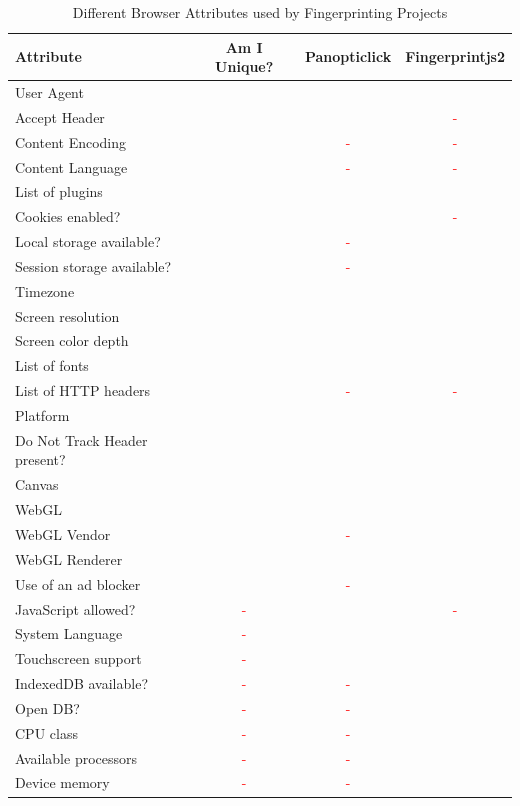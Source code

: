 \documentclass[
    fontsize=12pt,
    headings=small,
    parskip=half,
    bibliography=totoc,
    numbers=noenddot,
    open=any
    ]{scrreprt}
\newcommand{\cmark}{\textcolor{green}{\ding{51}}}
\newcommand{\xmark}{\textcolor{red}{-}}
\begin{document}
\renewcommand{\arraystretch}{1.2}
\begin{table}
\centering
\caption{Different Browser Attributes used by Fingerprinting Projects}
\begin{tabular}{ l c c c }
    \toprule
    Attribute & Am I Unique? & Panopticlick & Fingerprintjs2 \\
    \midrule
    User Agent & \cmark & \cmark & \cmark \\[3px]
    Accept Header & \cmark & \cmark & \xmark \\[3px]
    Content Encoding & \cmark & \xmark & \xmark \\[3px]
    Content Language & \cmark & \xmark & \xmark \\[3px]
    List of plugins & \cmark & \cmark & \cmark \\[3px]
    Cookies enabled? & \cmark & \cmark & \xmark \\[3px]
    Local storage available? & \cmark & \xmark & \cmark \\[3px]
    Session storage available? & \cmark & \xmark & \cmark \\[3px]
    Timezone & \cmark & \cmark & \cmark \\[3px]
    Screen resolution & \cmark & \cmark & \cmark \\[3px]
    Screen color depth & \cmark & \cmark & \cmark \\[3px]
    List of fonts & \cmark & \cmark & \cmark \\[3px]
    List of HTTP headers & \cmark & \xmark & \xmark \\[3px]
    Platform & \cmark & \cmark & \cmark \\[3px]
    Do Not Track Header present? & \cmark & \cmark & \cmark \\[3px]
    Canvas & \cmark & \cmark & \cmark \\[3px]
    WebGL & \cmark & \cmark & \cmark \\[3px]
    WebGL Vendor & \cmark & \xmark & \cmark \\[3px]
    WebGL Renderer & \cmark & \cmark & \cmark \\[3px]
    Use of an ad blocker & \cmark & \xmark & \cmark \\[3px]
    JavaScript allowed? & \xmark & \cmark & \xmark \\[3px]
    System Language & \xmark & \cmark & \cmark \\[3px]
    Touchscreen support & \xmark & \cmark & \cmark \\[3px]
    IndexedDB available? & \xmark & \xmark & \cmark \\[3px]
    Open DB? & \xmark & \xmark & \cmark \\[3px]
    CPU class & \xmark & \xmark & \cmark \\[3px]
    Available processors & \xmark & \xmark & \cmark \\[3px]
    Device memory & \xmark & \xmark & \cmark \\[3px]
    \bottomrule
\end{tabular}
\label{table:attributes_used}
\end{table}
\end{document}
